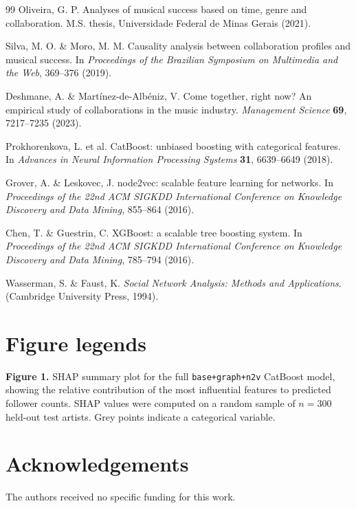 \documentclass[fleqn,10pt]{wlscirep}
\begin{document}
\begin{thebibliography}{99}
Oliveira, G. P. 
Analyses of musical success based on time, genre and collaboration. 
M.S. thesis, Universidade Federal de Minas Gerais (2021).

Silva, M. O. \& Moro, M. M. 
Causality analysis between collaboration profiles and musical success. 
In \textit{Proceedings of the Brazilian Symposium on Multimedia and the Web}, 369--376 (2019).

Deshmane, A. \& Martínez-de-Albéniz, V. 
Come together, right now? An empirical study of collaborations in the music industry. 
\textit{Management Science} \textbf{69}, 7217--7235 (2023).

Prokhorenkova, L. et al. 
CatBoost: unbiased boosting with categorical features. 
In \textit{Advances in Neural Information Processing Systems} \textbf{31}, 6639--6649 (2018).

Grover, A. \& Leskovec, J. 
node2vec: scalable feature learning for networks. 
In \textit{Proceedings of the 22nd ACM SIGKDD International Conference on Knowledge Discovery and Data Mining}, 855--864 (2016).

Chen, T. \& Guestrin, C. 
XGBoost: a scalable tree boosting system. 
In \textit{Proceedings of the 22nd ACM SIGKDD International Conference on Knowledge Discovery and Data Mining}, 785--794 (2016).

Wasserman, S. \& Faust, K. 
\textit{Social Network Analysis: Methods and Applications}. 
(Cambridge University Press, 1994).

\end{thebibliography}

\section*{Figure legends}

\textbf{Figure 1.} SHAP summary plot for the full \texttt{base+graph+n2v} CatBoost model, showing the relative contribution of the most influential features to predicted follower counts. SHAP values were computed on a random sample of $n=300$ held-out test artists. Grey points indicate a categorical variable.


\section*{Acknowledgements}
The authors received no specific funding for this work.
\end{document}
